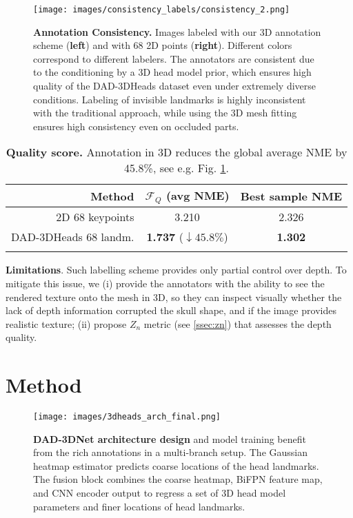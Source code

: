 \documentclass[10pt,twocolumn,letterpaper]{article}
\begin{document}
\begin{figure}[t]\centering
\texttt{[image: images/consistency\_labels/consistency\_2.png]}

  \caption{\textbf{Annotation Consistency.} Images labeled with our 3D annotation scheme (\textbf{left}) and with 68 2D points (\textbf{right}). Different colors correspond to different labelers. The annotators are consistent due to the conditioning by a 3D head model prior,
which ensures high quality of the DAD-3DHeads dataset even under extremely diverse conditions. Labeling of invisible landmarks is highly inconsistent with the traditional approach, while using the 3D mesh fitting ensures high consistency even on occluded parts.
}
  \vspace{-1em}
  \label{fig:labeling_consistency}
\end{figure}

\begin{table}[t]
\footnotesize
\renewcommand{\arraystretch}{0.95}
\centering
\begin{tabular}{r|c|c}
\noalign{\smallskip}
Method & $\mathcal{F}_Q$ (avg NME) & Best sample NME\\
\hline
2D 68 keypoints & 3.210 & 2.326\\
DAD-3DHeads 68 landm. & \textbf{1.737} \textcolor{ao(english)}{($\downarrow 45.8\%$)} &  \textbf{1.302} \\
\noalign{\smallskip}
\end{tabular}
\caption{\textbf{Quality score.} Annotation in 3D reduces  the global average NME by 45.8\%, see e.g. Fig. \ref{fig:labeling_consistency}.
}
\label{t:consistency_matrix}
\end{table} 
\textbf{Limitations}. Such labelling scheme provides only partial control over depth. To mitigate this issue, we (i) provide the annotators with the ability to see the rendered texture onto the mesh in 3D, so they can inspect visually whether the lack of depth information corrupted the skull shape, and if the image provides realistic texture; (ii) propose $Z_n$ metric (see \cref{ssec:zn}) that assesses the depth quality. \section{Method}

\begin{figure*}[t!]\centering

  \texttt{[image: images/3dheads\_arch\_final.png]}
  \vspace{-1em}
  \caption{\textbf{DAD-3DNet architecture design} and model training benefit from the rich annotations in a multi-branch setup. The Gaussian heatmap estimator predicts coarse locations of the head landmarks. The fusion block combines the coarse heatmap, BiFPN feature map, and CNN encoder output to regress a set of 3D head model parameters and finer locations of head landmarks.}
\label{fig:arch}
\end{figure*}
\end{document}
